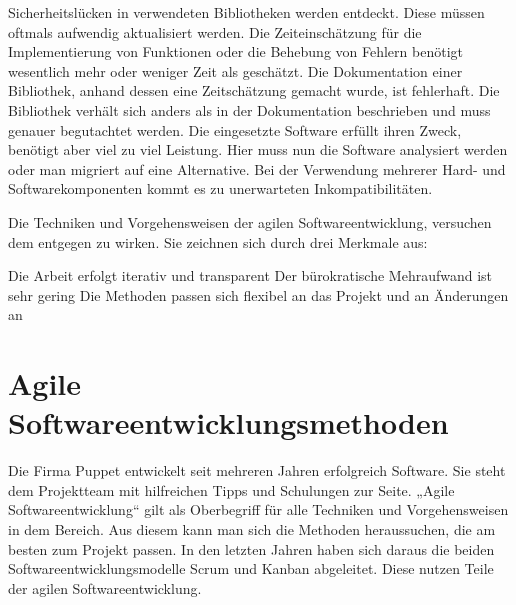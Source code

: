 {\begin{outline}
  \1 Sicherheitslücken in verwendeten Bibliotheken werden entdeckt. Diese
  müssen oftmals aufwendig aktualisiert werden.
  \1 Die Zeiteinschätzung für die Implementierung von Funktionen oder die
  Behebung von Fehlern benötigt wesentlich mehr oder weniger Zeit als
  geschätzt.
  \1 Die Dokumentation einer Bibliothek, anhand dessen eine Zeitschätzung
  gemacht wurde, ist fehlerhaft. Die Bibliothek verhält sich anders als in der
  Dokumentation beschrieben und muss genauer begutachtet werden.
  \1 Die eingesetzte Software erfüllt ihren Zweck, benötigt aber viel zu viel
  Leistung. Hier muss nun die Software analysiert werden oder man migriert auf
  eine Alternative.
  \1 Bei der Verwendung mehrerer Hard- und Softwarekomponenten kommt es zu
  unerwarteten Inkompatibilitäten.
\end{outline}

Die Techniken und Vorgehensweisen der agilen Softwareentwicklung, versuchen dem
entgegen zu wirken. Sie zeichnen sich durch drei Merkmale aus:

\begin{outline}
  \1 Die Arbeit erfolgt iterativ und transparent
  \1 Der bürokratische Mehraufwand ist sehr gering
  \1 Die Methoden passen sich flexibel an das Projekt und an Änderungen an
\end{outline}
\tm%

\section{Agile Softwareentwicklungsmethoden}
Die Firma Puppet entwickelt seit mehreren Jahren erfolgreich Software. Sie
steht dem Projektteam mit hilfreichen Tipps und Schulungen zur Seite. „Agile
Softwareentwicklung“ gilt als Oberbegriff für alle Techniken und
Vorgehensweisen in dem Bereich. Aus diesem kann man sich die Methoden
heraussuchen, die am besten zum Projekt passen. In den letzten Jahren haben
sich daraus die beiden Softwareentwicklungsmodelle Scrum und Kanban abgeleitet.
Diese nutzen Teile der agilen Softwareentwicklung.
\tm%

}
